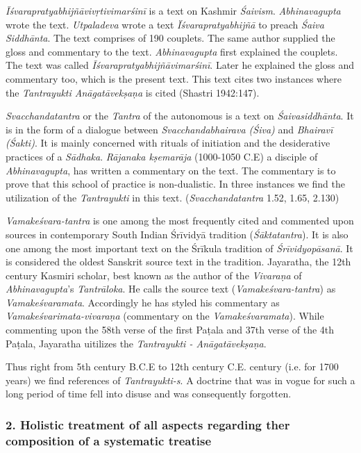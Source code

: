 \textit{Īśvarapratyabhijñāvivṛtivimarśinī} is a text on Kashmir \textit{Śaivism}. \textit{Abhinavagupta} wrote the text. \textit{Utpaladeva} wrote a text \textit{Ïśvarapratyabhijñā} to preach \textit{Śaiva Siddhānta}. The text comprises of 190 couplets. The same author supplied the gloss and commentary to the text. \textit{Abhinavagupta} first explained the couplets. The text was called \textit{Īśvarapratyabhijñāvimarśinī}. Later he explained the gloss and commentary too, which is the present text. This text cites two instances where the \textit{Tantrayukti Anāgatāvekṣaṇa} is cited (Shastri 1942:147).

\textit{Svacchandatantra} or the \textit{Tantra} of the autonomous is a text on \textit{Śaivasiddhānta}. It is in the form of a dialogue between \textit{Svacchandabhairava (Śiva)} and \textit{Bhairavī (Śakti)}. It is mainly concerned with rituals of initiation and the desiderative practices of a \textit{Sādhaka}. \textit{Rājanaka kṣemarāja} (1000-1050 C.E) a disciple of \textit{Abhinavagupta}, has written a commentary on the text. The commentary is to prove that this school of practice is non-dualistic. In three instances we find the utilization of the \textit{Tantrayukti} in this text. (\textit{Svacchandatantra} 1.52, 1.65, 2.130)

\textit{Vamakeśvara-tantra} is one among the most frequently cited and commented upon sources in contemporary South Indian Śrīvidyā tradition (\textit{Śāktatantra}). It is also one among the most important text on the Śrīkula tradition of \textit{Śrīvidyopāsanā}. It is considered the oldest Sanskrit source text in the tradition. Jayaratha, the 12th century Kasmiri scholar, best known as the author of the \textit{Vivaraṇa} of \textit{Abhinavagupta}’s \textit{Tantrāloka}. He calls the source text (\textit{Vamakeśvara-tantra}) as \textit{Vamakeśvaramata}. Accordingly he has styled his commentary as \textit{Vamakeśvarimata-vivaraṇa} (commentary on the \textit{Vamakeśvaramata}). While commenting upon the 58th verse of the first Paṭala and 37th verse of the 4th Paṭala, Jayaratha uitilizes the \textit{Tantrayukti - Anāgatāvekṣaṇa}.

Thus right from 5th century B.C.E to 12th century C.E. century (i.e. for 1700 years) we find references of \textit{Tantrayukti-s}. A doctrine that was in vogue for such a long period of time fell into disuse and was consequently forgotten.


\subsubsection*{2. Holistic treatment of all aspects regarding ther composition of a systematic treatise}

